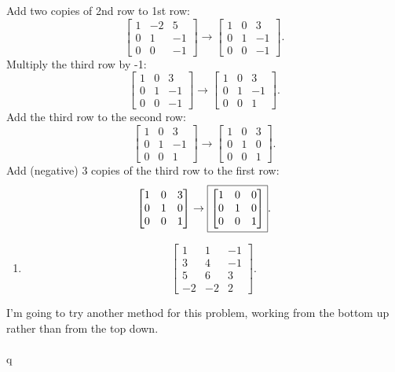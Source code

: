 \documentclass[letterpaper]{report}
\begin{document}
Add two copies of 2nd row to 1st row: 
\[
\begin{bmatrix} 
    1 & -2 & 5 \\
    0 & 1 & -1 \\
    0 & 0 & -1
\end{bmatrix}
\to 
\begin{bmatrix} 
    1 & 0 & 3 \\
    0 & 1 & -1 \\
    0 & 0 & -1  
\end{bmatrix} 
.\] 
Multiply the third row by -1: 
\[
\begin{bmatrix} 
    1 & 0 & 3 \\
    0 & 1 & -1 \\
    0 & 0 & -1
\end{bmatrix} \to 
\begin{bmatrix} 
    1 & 0 & 3 \\
    0 & 1 & -1 \\
    0 & 0 & 1
\end{bmatrix} 
.\] 
Add the third row to the second row: 
\[
\begin{bmatrix} 
    1 & 0 & 3 \\
    0 & 1 & -1 \\
    0 & 0 & 1
\end{bmatrix} \to 
\begin{bmatrix} 
    1 & 0 & 3 \\
    0 & 1 & 0 \\
    0 & 0 & 1
\end{bmatrix} 
.\] 
Add (negative) 3 copies of the third row to the first row: 
\[
\begin{bmatrix} 
    1 & 0 & 3 \\
    0 & 1 & 0 \\
    0 & 0 & 1
\end{bmatrix} \to 
\fbox{$
\begin{bmatrix} 
    1 & 0 & 0 \\
    0 & 1 & 0 \\
    0 & 0 & 1
\end{bmatrix} $}
.\] 
\begin{enumerate}[(label=\alph*)]
    \setcounter{enumi}(b)
    \item \[
    \begin{bmatrix} 
        1 & 1 & -1 \\
        3 & 4 & -1 \\
        5 & 6 & 3 \\
        -2 & -2 & 2
    \end{bmatrix} 
    .\] 
\end{enumerate}
I'm going to try another method for this problem, working from the bottom up rather than from the top down. 
\\ \\ 
q
\end{document}
